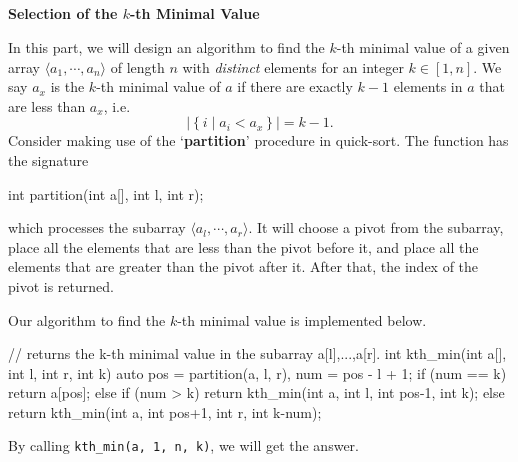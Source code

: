 
\begin{parts}
\part{} \textbf{Selection of the \(k\)-th Minimal Value} \par
In this part, we will design an algorithm to find the \(k\)-th minimal value of a given array \(\langle a_1,\cdots,a_n\rangle\) of length \(n\) with \emph{distinct} elements for an integer \(k\in[1,n]\). We say \(a_x\) is the \(k\)-th minimal value of \(a\) if there are exactly \(k-1\) elements in \(a\) that are less than \(a_x\), i.e.
\[\left|\left\{i\mid a_i<a_x\right\}\right|=k-1.\]
Consider making use of the `\textbf{partition}' procedure in quick-sort. The function has the signature
\begin{cpp}
  int partition(int a[], int l, int r);
\end{cpp}
which processes the subarray \(\langle a_l,\cdots,a_r\rangle\). It will choose a pivot from the subarray, place all the elements that are less than the pivot before it, and place all the elements that are greater than the pivot after it. After that, the index of the pivot is returned.

Our algorithm to find the \(k\)-th minimal value is implemented below.
\begin{cpp}
  // returns the k-th minimal value in the subarray a[l],...,a[r].
  int kth_min(int a[], int l, int r, int k) {
    auto pos = partition(a, l, r), num = pos - l + 1;
    if (num == k)
      return a[pos];
    else if (num > k)
      return kth_min(int a, int l, int pos-1, int k);
    else
      return kth_min(int a, int pos+1, int r, int k-num);
  }
\end{cpp}
By calling \lstinline{kth_min(a, 1, n, k)}, we will get the answer.


\end{parts}
